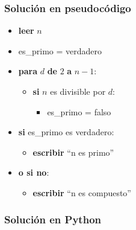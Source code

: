 \documentclass[12pt]{beamer}
\begin{document}
  \begin{frame}
    \frametitle{Solución en pseudocódigo}
    \label{sol-pseudocodigo}
    \begin{itemize}
      \item \textbf{leer} \(n\)
      \item es\_primo = verdadero
      \item \textbf{para} \(d\) \textbf{de} \(2\) \textbf{a} \(n - 1\):
      \begin{itemize}
        \item \textbf{si} \(n\) es divisible por \(d\):
        \begin{itemize}
          \item es\_primo = falso
        \end{itemize}
      \end{itemize}
      \item \textbf{si} es\_primo es verdadero:
      \begin{itemize}
        \item \textbf{escribir} ``n es primo''
      \end{itemize}
      \item \textbf{o si no}:
      \begin{itemize}
        \item \textbf{escribir} ``n es compuesto''
      \end{itemize}
    \end{itemize}
  \end{frame}

  \begin{frame}
    \frametitle{Solución en Python}
    \label{sol-python}
    
  \end{frame}

  \begin{frame}
  \end{frame}
\end{document}
